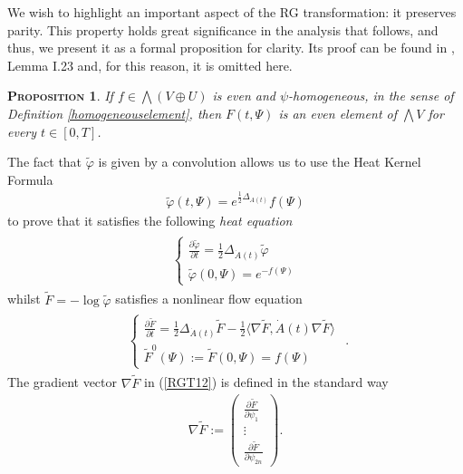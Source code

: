 \documentclass[12pt,twoside]{amsart}
\newtheorem{prop}{\textsc{Proposition}} [section]
\numberwithin{equation}{section}
\begin{document}
We wish to highlight an important aspect of the RG transformation: it preserves parity. This property holds great significance in the analysis that follows, and thus, we present it as a formal proposition for clarity. Its proof can be found in \cite{FKTbook}, Lemma I.23 and, for this reason, it is omitted here. 

\begin{prop}\label{parity} If $f \in \bigwedge (V\oplus U)$ is even and $\psi$-homogeneous, in the sense of Definition \ref{homogeneouselement}, then $F(t,\Psi)$ is an even element of $\bigwedge V$ for every $t \in [0,T]$.
\end{prop}

The fact that $\tilde{\varphi}$ is given by a convolution allows us to use the Heat Kernel Formula
\begin{eqnarray}
\tilde{\varphi}(t,\Psi) = e^{\frac{1}{2}\Delta_{A(t)}}f(\Psi) \label{RGT10}
\end{eqnarray}
to prove that it satisfies the following \textit{heat equation}
\begin{align}
\label{RG11}
\begin{split}
\begin{cases}
\displaystyle\frac{\partial \tilde{\varphi}}{\partial t} = \frac{1}{2}\Delta_{\dot{A}(t)}\tilde{\varphi} \\
\displaystyle \tilde{\varphi}(0,\Psi) = e^{-f(\Psi)}
\end{cases}
\end{split}
\end{align}
whilst $\tilde{F} = -\log \tilde{\varphi}$ satisfies a nonlinear flow equation
\begin{align}
\label{RGT12}
\begin{split}
\begin{cases}
\displaystyle\frac{\partial \tilde{F}}{\partial t} = \frac{1}{2}\Delta_{\dot{A}(t)}\tilde{F}-\frac{1}{2}\langle \nabla \tilde{F}, \dot{A}(t)\nabla \tilde{F}\rangle  \\
\displaystyle \tilde{F}^{0}(\Psi) := \tilde{F}(0,\Psi) = f(\Psi)
\end{cases}
\end{split}
.
\end{align}
The gradient vector $\nabla \tilde{F}$ in (\ref{RGT12}) is defined in the standard way
\begin{eqnarray}
\nabla \tilde{F} := \begin{pmatrix}
\frac{\partial \tilde{F}}{\partial \psi_{1}} \\
\vdots \\
\frac{\partial \tilde{F}}{\partial \psi_{2n}} 
\end{pmatrix}
.\label{RGT13}
\end{eqnarray}
\end{document}
